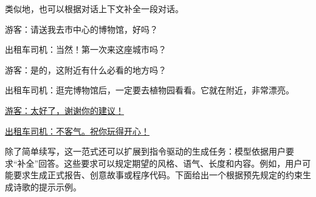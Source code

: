 类似地，也可以根据对话上下文补全一段对话。

\vspace{0.5em}
\begin{tcolorbox}

\begingroup
\setlength{\leftskip}{2em}
\setlength{\rightskip}{2em}


\vspace{0.7em}

游客：请送我去市中心的博物馆，好吗？

\vspace{0.3em}

出租车司机：当然！第一次来这座城市吗？

\vspace{0.3em}

游客：是的，这附近有什么必看的地方吗？

\vspace{0.3em}

出租车司机：逛完博物馆后，一定要去植物园看看。它就在附近，非常漂亮。

\vspace{0.3em}

\uline{游客：太好了，谢谢你的建议！}

\vspace{0.3em}

\uline{出租车司机：不客气。祝你玩得开心！}

\endgroup

\end{tcolorbox}
\vspace{0.5em}

除了简单续写，这一范式还可以扩展到指令驱动的生成任务：模型依据用户要求“补全”回答。这些要求可以规定期望的风格、语气、长度和内容。例如，用户可能要求生成正式报告、创意故事或程序代码。下面给出一个根据预先规定的约束生成诗歌的提示示例。

